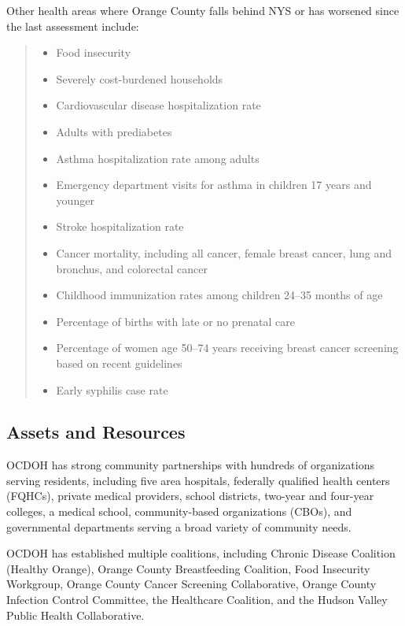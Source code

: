 \documentclass[
  english,
  letterpaper,
]{report}
\providecommand{\tightlist}{%
  \setlength{\itemsep}{0pt}\setlength{\parskip}{0pt}}
\begin{document}
Other health areas where Orange County falls behind NYS or has worsened
since the last assessment include:

\begin{quote}
\begin{itemize}
\tightlist
\item
  Food insecurity
\item
  Severely cost-burdened households
\item
  Cardiovascular disease hospitalization rate
\item
  Adults with prediabetes
\item
  Asthma hospitalization rate among adults
\item
  Emergency department visits for asthma in children 17 years and
  younger
\item
  Stroke hospitalization rate
\item
  Cancer mortality, including all cancer, female breast cancer, lung and
  bronchus, and colorectal cancer
\item
  Childhood immunization rates among children 24--35 months of age
\item
  Percentage of births with late or no prenatal care
\item
  Percentage of women age 50--74 years receiving breast cancer screening
  based on recent guidelines
\item
  Early syphilis case rate
\end{itemize}
\end{quote}

\subsection{Assets and Resources}\label{assets-and-resources-1}

OCDOH has strong community partnerships with hundreds of organizations
serving residents, including five area hospitals, federally qualified
health centers (FQHCs), private medical providers, school districts,
two-year and four-year colleges, a medical school, community-based
organizations (CBOs), and governmental departments serving a broad
variety of community needs.

OCDOH has established multiple coalitions, including Chronic Disease
Coalition (Healthy Orange), Orange County Breastfeeding Coalition, Food
Insecurity Workgroup, Orange County Cancer Screening Collaborative,
Orange County Infection Control Committee, the Healthcare Coalition, and
the Hudson Valley Public Health Collaborative.
\end{document}
